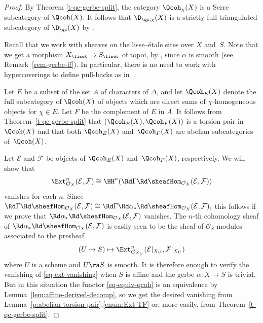\begin{proof}
By Theorem \ref{t-qc-gerbe-split},
the category $\Qcoh_\chi(X)$ is a Serre subcategory of $\Qcoh(X)$.
It follows that $\D_{\qc, \chi}(X)$ is a strictly full triangulated subcategory of $\D_\qc(X)$
by \cite[, ]{stacks-project}.

Recall that we work with sheaves on the lisse--étale sites over $X$ and~$S$.
Note that we get a morphism $X_{\liset} \to S_{\liset}$ of topoi,
by 
\cite[]{stacks-project},
since $\alpha$ is smooth (see Remark~\ref{rem-gerbe-ff}).
In particular, there is no need to work with hypercoverings to define pull-backs as in~\cite{olsson2007}.

Let $E$ be a subset of the set $A$ of characters of $\Delta$,
and let $\Qcoh_E(X)$ denote the full subcategory of $\Qcoh(X)$ of objects
which are direct sums of $\chi$-homogeneous objects for $\chi \in E$.
Let $F$ be the complement of $E$ in $A$.
It follows from Theorem~\ref{t-qc-gerbe-split}
that $(\Qcoh_E(X), \Qcoh_F(X))$ is a torsion pair in $\Qcoh(X)$ and that both
$\Qcoh_E(X)$ and~$\Qcoh_F(X)$ are abelian subcategories of~$\Qcoh(X)$.

Let $\mathcal{E}$ and $\mathcal{F}$ be objects of $\Qcoh_E(X)$ and~$\Qcoh_F(X)$,
respectively.
We will show that
\begin{equation}
\label{eq-ext-vanishing}
\Ext^n_{\mathcal{O}_X}(\mathcal{E}, \mathcal{F})
\cong \HH^n(\Rd\Gamma\Rd\sheafHom_{\mathcal{O}_X}(\mathcal{E}, \mathcal{F}))
\end{equation}
vanishes for each $n$.
Since
$
\Rd\Gamma\Rd\sheafHom_{\mathcal{O}_X}(\mathcal{E}, \mathcal{F})
\cong
\Rd\Gamma\Rd\alpha_\ast\Rd\sheafHom_{\mathcal{O}_X}(\mathcal{E}, \mathcal{F}),
$
this follows if we prove that $\Rd\alpha_\ast\Rd\sheafHom_{\mathcal{O}_X}(\mathcal{E}, \mathcal{F})$ vanishes.
The $n$-th cohomology sheaf of $\Rd\alpha_\ast\Rd\sheafHom_{\mathcal{O}_X}(\mathcal{E}, \mathcal{F})$ is easily seen
to be the sheaf of $\mathcal{O}_S$-modules associated to the presheaf
\begin{equation*}
(U \to S) \mapsto
\Ext^n_{\mathcal{O}_{X_U}}(\mathcal{E}|_{X_U}, 
\mathcal{F}|_{X_U})
\end{equation*}
where $U$ is a scheme and $U \ra S$ is smooth. 
It is therefore enough to verify the vanishing of \eqref{eq-ext-vanishing} when $S$ is affine and the gerbe
$\alpha\colon X \to S$ is trivial.
But in this situation the functor \eqref{eq-equiv-qcoh} is an equivalence by Lemma~\ref{lem:affine-derived-decomp},
so we get the desired vanishing from
Lemma~\ref{p:abelian-torsion-pair}.\ref{enum:Ext-TF} or, more
easily, from
Theorem~\ref{t-qc-gerbe-split}.


\end{proof}
